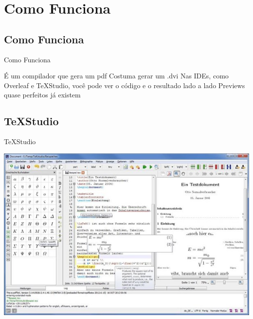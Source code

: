 \documentclass{beamer}
\begin{document}
\section{Como Funciona}
\subsection{Como Funciona}
\begin{frame}{Como Funciona}
\begin{outline}%
  \1 É um compilador que gera um pdf
   \2 Costuma gerar um .dvi
   \1 Nas IDEs, como Overleaf e \TeX Studio, você pode ver o código e o resultado lado a lado
   \1 Previews quase perfeitos já existem
\end{outline}
\end{frame}

\subsection{\TeX  Studio}
\begin{frame}{\TeX  Studio}
\begin{center}
    \includegraphics[width=\linewidth]{Images/Picture1.jpg}
\end{center}
\end{frame} 

   
\end{document}
